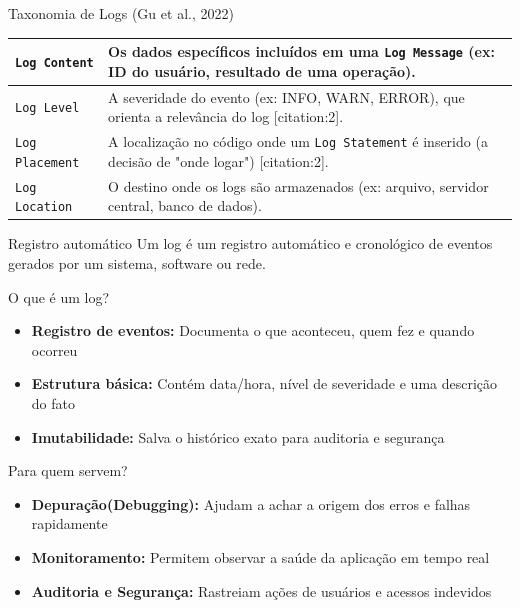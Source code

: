 \documentclass{if-beamer}
\begin{document}
\begin{frame}[allowframebreaks]{Taxonomia de Logs (Gu et al., 2022)}
\begin{table}
\begin{tabular}{|p{2.8cm}|p{8.5cm}|}
            \texttt{Log Content} & Os dados específicos incluídos em uma \texttt{Log Message} (ex: ID do usuário, resultado de uma operação). \\
            \hline
            \texttt{Log Level} & A severidade do evento (ex: INFO, WARN, ERROR), que orienta a relevância do log [citation:2]. \\
            \hline
            \texttt{Log Placement} & A localização no código onde um \texttt{Log Statement} é inserido (a decisão de "onde logar") [citation:2]. \\
            \hline
            \texttt{Log Location} & O destino onde os logs são armazenados (ex: arquivo, servidor central, banco de dados). \\
            \hline
        \end{tabular}
    \end{table}
\end{frame}


\begin{frame}
\begin{block}{Registro automático}
Um log é um registro automático e cronológico de eventos gerados por um sistema, software ou rede.

\end{block}
\end{frame}


\begin{frame}{O que é um log?}
\begin{itemize}
\item \textbf{Registro de eventos:} Documenta o que aconteceu, quem fez e quando ocorreu
\item \textbf{Estrutura básica:} Contém data/hora, nível de severidade e uma descrição do fato
\item \textbf{Imutabilidade:} Salva o histórico exato para auditoria e segurança
\end{itemize}

\end{frame}	

\begin{frame}{Para quem servem?}
\begin{itemize}
\item \textbf{Depuração(Debugging):} Ajudam a achar a origem dos erros e falhas rapidamente
\item \textbf{Monitoramento:} Permitem observar a saúde da aplicação em tempo real
\item \textbf{Auditoria e Segurança:} Rastreiam ações de usuários e acessos indevidos
\end{itemize}

\end{frame}
\end{document}
